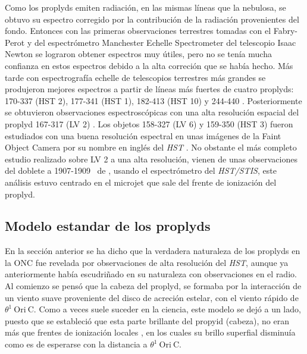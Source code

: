 Como los proplyds emiten radiación, en las mismas líneas que la nebulosa, se obtuvo su espectro  corregido por la contribución de la radiación provenientes del fondo. Entonces con las primeras observaciones terrestres tomadas con el Fabry-Perot \citep{Fuente:2003} y del espectrómetro Manchester Echelle Spectrometer del telescopio Isaac Newton \citep{Henney:1997} se lograron obtener espectros muy útiles, pero no se tenía mucha confianza en estos espectros debido a la alta correción que se había hecho. Más tarde con espectrografía echelle de telescopios terrestres más grandes se produjeron mejores espectros a partir de líneas más fuertes de cuatro proplyds: 170-337 (HST 2), 177-341 (HST 1), 182-413 (HST 10) y 244-440 \citep{Henney:1999a}.  Posteriormente se obtuvieron observaciones espectroscópicas con una alta resolución espacial del proplyd 167-317 (LV 2) \citep{Vasconcelos:2005}. Los objetos 158-327 (LV 6) y 159-350 (HST 3) fueron estudiados con una buena resolución espectral en unas imágenes de la Faint Object Camera por su nombre en inglés del \textit{HST} \citep{Bally:1998a}. No obstante el más completo estudio realizado sobre  LV 2  a una alta resolución, vienen de unas observaciones \citep{Henney:2002a} del doblete a 1907-1909~\A{} de \ciii{}, usando el espectrómetro del \textit{HST/STIS}, este análisis estuvo centrado en el microjet que sale del frente de ionización del proplyd.    

\subsection{Modelo estandar de los proplyds}
\label{sec:modelo}

En la sección anterior se ha dicho que la verdadera naturaleza de los proplyds en la ONC fue revelada por observaciones de alta resolución del \textit{HST}, aunque ya anteriormente \citet{Churchwell:1987} había escudriñado en su naturaleza con observaciones en el radio. Al comienzo se pensó que la cabeza del proplyd, se formaba por la interacción de un viento suave proveniente del disco de acreción estelar, con el viento rápido de \(\theta^1\ \text{Ori}\ \text{C}\). Como a veces suele suceder en la ciencia, este modelo se dejó a un lado, puesto que se estableció que esta parte brillante del propyid (cabeza), no eran más que frentes de ionización locales \citep{Odell:1994}, en los cuales su brillo superfial disminuía como es de esperarse con la distancia a  \(\theta^1\ \text{Ori}\ \text{C}\).\\


